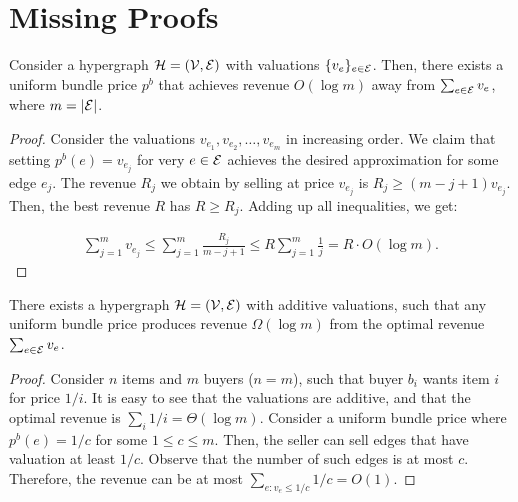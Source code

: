 \section{Missing Proofs}
\label{sec:appendix}

\begin{lemma}
Consider a hypergraph $\mathcal{H} = (\mathcal{V}, \mathcal{E})$ with valuations $\{v_e\}_{e \in \mathcal{E}}$. Then, there exists a uniform bundle price $p^{b}$ that achieves revenue $O(\log m)$ away from  $\sum_{e \in \mathcal{E}} v_e$, where $m = |\mathcal{E}|$.
\end{lemma}

\begin{proof}
Consider the valuations $v_{e_1}, v_{e_2}, \dots, v_{e_m}$ in increasing order. We claim that setting $p^{b}(e)  = v_{e_j}$ for very $e \in \mathcal{E}$ achieves the 
desired approximation for some edge $e_{j}$. 
The revenue $R_j$ we obtain by selling at price $v_{e_j}$ is $R_j \geq (m-j+1)v_{e_j} $. Then, the best revenue $R$ has $R \geq R_j$.
Adding up all inequalities, we get:
	
	\begin{equation*}
	\begin{aligned}
	\sum_{j=1}^m v_{e_j} \leq  \sum_{j=1}^m \frac{R_j}{m-j+1} \leq R \sum_{j=1}^m \frac{1}{j} = R \cdot O(\log m) .
	\end{aligned}
	\end{equation*}
\end{proof}


\begin{lemma} \label{lem:lb1}
There exists a hypergraph $\mathcal{H} = (\mathcal{V}, \mathcal{E})$ with additive valuations, such that any uniform bundle price produces revenue $\Omega(\log m)$ from the optimal revenue
$\sum_{e \in \mathcal{E}} v_e$.
\end{lemma}	

\begin{proof}
	Consider $n$ items and $m$ buyers ($n=m$), such that buyer $b_i$ wants item $i$ for price $1/i$. It is easy to see that the valuations are additive, and that the optimal revenue
	is $\sum_i 1/i = \Theta(\log m)$. Consider a uniform bundle price where $p^b(e) = 1/c$ for some $1 \leq c \leq m$. Then, the seller can sell edges that have valuation at least $1/c$. Observe that the number of such edges is at most $c$. Therefore, the revenue can be at most $\sum_{e:v_e \leq 1/c} 1/c = O(1)$.
\end{proof}


